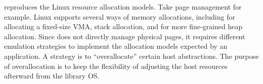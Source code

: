 \thelibos{} reproduces the Linux resource allocation models.
Take page management for example.
Linux supports several ways of memory allocations, including  for allocating a fixed-size VMA, stack allocation, and  for more fine-grained heap allocation.
Since \thelibos{} does not directly manage physical pages,
it requires different emulation strategies to
implement the allocation models expected by an application. %
A strategy %
is to ``overallocate'' certain host abstractions.
The purpose of overallocation is
to keep the flexibility of adjusting the host resources afterward from the library OS.












